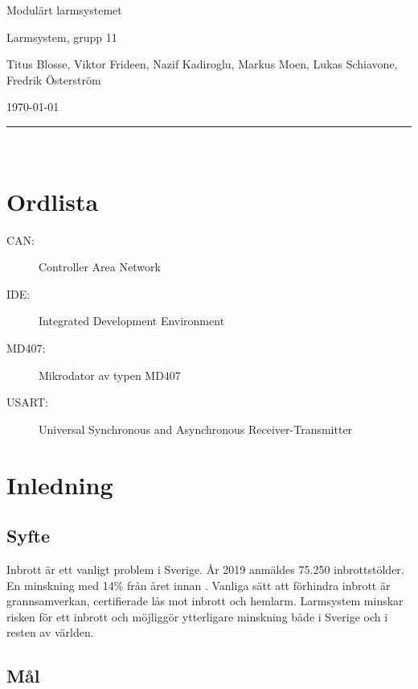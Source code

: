\documentclass[a4paper]{article}
\newcommand\namn{Larmsystem}
\begin{document}
\thispagestyle{empty}

\begin{center}
    \parskip=14pt
    \vspace*{3\parskip}

    {\LARGE Modulärt larmsystemet}

    {\large \namn, grupp 11

    Titus Blosse, Viktor Frideen, Nazif Kadiroglu, Markus Moen, Lukas Schiavone, Fredrik Österström

    \today}

    \rule{7cm}{0.4pt}\\
\end{center}
\newpage

\thispagestyle{empty}

\tableofcontents
\newpage

\thispagestyle{empty}

\section*{Ordlista}

\begin{description}
    \item[CAN:] Controller Area Network
    \item[IDE:] Integrated Development Environment
    \item[MD407:] Mikrodator av typen MD407
    \item[USART:] Universal Synchronous and Asynchronous Receiver-Transmitter 
\end{description}
\newpage


\section{Inledning}
\subsection{Syfte}
Inbrott är ett vanligt problem i Sverige. År 2019 anmäldes 75.250 inbrottstölder. En minskning med 14\% från året innan \cite{brastold}. Vanliga sätt att förhindra inbrott är grannsamverkan, certifierade lås mot inbrott och hemlarm. Larmsystem minskar risken för ett inbrott och möjliggör ytterligare minskning både i Sverige och i resten av världen.

\subsection{Mål}
\end{document}
